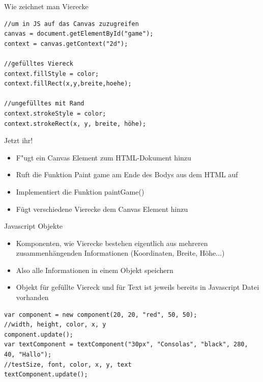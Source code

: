 \documentclass[18pt]{beamer}
\begin{document}
\begin{frame}[fragile]{Wie zeichnet man Vierecke}
\begin{lstlisting}
//um in JS auf das Canvas zuzugreifen
canvas = document.getElementById("game");
context = canvas.getContext("2d");

//gefülltes Viereck
context.fillStyle = color;
context.fillRect(x,y,breite,hoehe);

//ungefülltes mit Rand
context.strokeStyle = color;
context.strokeRect(x, y, breite, höhe);
\end{lstlisting}

\end{frame}

\begin{frame}{Jetzt ihr!}
\begin{itemize}
	\item F"ugt ein Canvas Element zum HTML-Dokument hinzu
	\item Ruft die Funktion Paint game am Ende des Bodys aus dem HTML auf
	\item Implementiert die Funktion paintGame() 
	\item Fügt verschiedene Vierecke dem Canvas Element hinzu
\end{itemize}
\end{frame}

\begin{frame}[fragile]{Javascript Objekte}
\begin{itemize}
	\item Komponenten, wie Vierecke bestehen eigentlich aus mehreren zusammenhängenden Informationen (Koordinaten, Breite, Höhe...)
	\item Also alle Informationen in einem Objekt speichern 
	\item Objekt für gefüllte Viereck und für Text ist jeweils bereits in Javascript Datei vorhanden 
	
\end{itemize}
 \begin{lstlisting}
var component = new component(20, 20, "red", 50, 50);
//width, height, color, x, y
component.update();
var textComponent = textComponent("30px", "Consolas", "black", 280, 40, "Hallo");
//testSize, font, color, x, y, text
textComponent.update();
\end{lstlisting}
\end{frame}
\end{document}
